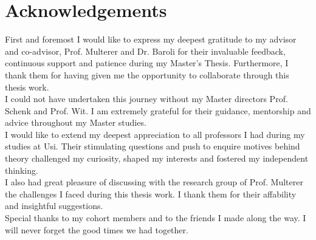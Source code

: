 \chapter*{Acknowledgements}
\thispagestyle{empty}

First and foremost I would like to express my deepest gratitude to my advisor and co-advisor, Prof. Multerer and Dr. Baroli for their invaluable feedback, continuous support and patience during my Master's Thesis. Furthermore, I thank them for having given me the opportunity to collaborate through this thesis work.
\\
I could not have undertaken this journey without my Master directors Prof. Schenk and Prof. Wit. I am extremely grateful for their guidance, mentorship and advice throughout my Master studies.
\\
I would like to extend my deepest appreciation to all professors I had during my studies at Usi. Their stimulating questions and push to enquire motives behind theory challenged my curiosity, shaped my interests and fostered my independent thinking.
\\
I also had great pleasure of discussing with the research group of Prof. Multerer the challenges I faced during this thesis work. I thank them for their affability  and insightful suggestions.
\\
Special thanks to my cohort members and to the friends I made along the way. I will never forget the good times we had together.
\clearpage